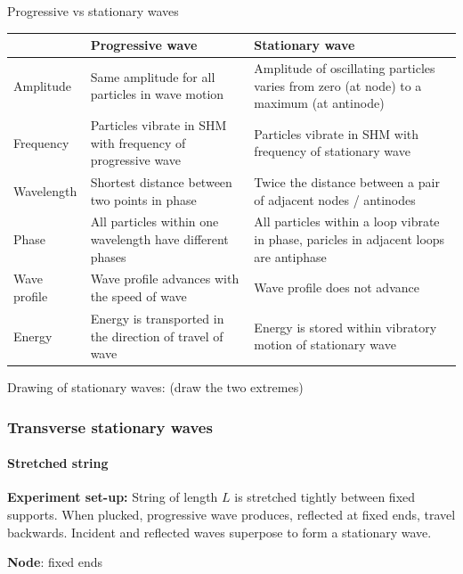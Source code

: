Progressive vs stationary waves
\begin{table}[H]
\centering
\begin{tabular}{|p{2cm}|p{6.5cm}|p{6.5cm}|}
\hline
& \textbf{Progressive wave} & \textbf{Stationary wave} \\
\hline
Amplitude & Same amplitude for all particles in wave motion & Amplitude of oscillating particles varies from zero (at node) to a maximum (at antinode) \\
\hline
Frequency & Particles vibrate in SHM with frequency of progressive wave & Particles vibrate in SHM with frequency of stationary wave \\
\hline
Wavelength & Shortest distance between two points in phase & Twice the distance between a pair of adjacent nodes / antinodes \\
\hline
Phase & All particles within one wavelength have different phases & All particles within a loop vibrate in phase, paricles in adjacent loops are antiphase \\
\hline
Wave profile & Wave profile advances with the speed of wave & Wave profile does not advance \\
\hline
Energy & Energy is transported in the direction of travel of wave & Energy is stored within vibratory motion of stationary wave \\
\hline
\end{tabular}
\end{table}

Drawing of stationary waves: (draw the two extremes)


\subsubsection{Transverse stationary waves}
\paragraph{Stretched string}

\textbf{Experiment set-up:} String of length $L$ is stretched tightly between fixed supports. When plucked, progressive wave produces, reflected at fixed ends, travel backwards. Incident and reflected waves superpose to form a stationary wave.

\textbf{Node}: fixed ends

